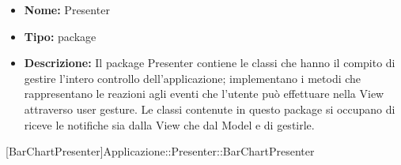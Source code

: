 			\begin{itemize}
			\item \textbf{Nome:} Presenter
			\item \textbf{Tipo:} package
			
			\item \textbf{Descrizione:} Il package Presenter contiene le classi che hanno il compito di gestire l'intero controllo dell'applicazione; implementano i metodi che rappresentano le reazioni agli eventi che l'utente può effettuare nella View attraverso user gesture. Le classi contenute in questo package si occupano di riceve le notifiche sia dalla View che dal Model e di gestirle.
			\end{itemize}

			
			[BarChartPresenter]{Applicazione::Presenter::BarChartPresenter}
			

	
